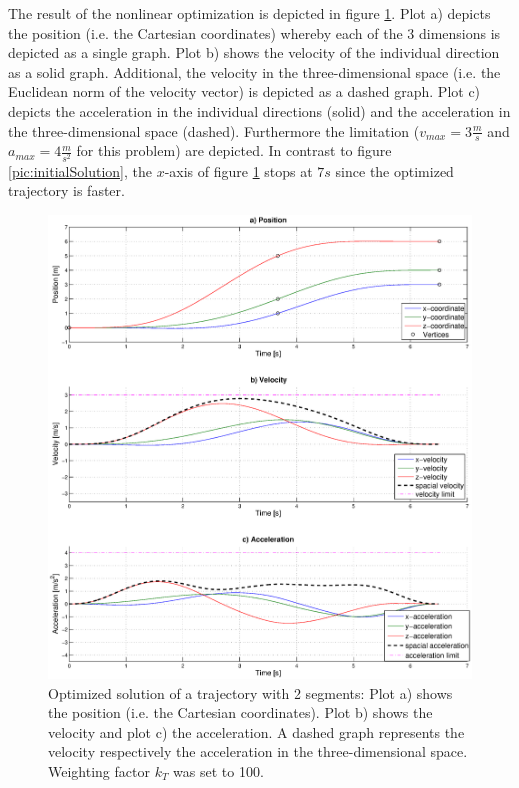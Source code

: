 The result of the nonlinear optimization is depicted in figure \ref{pic:optimizedSolution}. Plot a) depicts the position (i.e. the Cartesian coordinates) whereby each of the 3 dimensions is depicted as a single graph. Plot b) shows the velocity of the individual direction as a solid graph. Additional, the velocity in the three-dimensional space (i.e. the Euclidean norm of the velocity vector) is depicted as a dashed graph. Plot c) depicts the acceleration in the individual directions (solid) and the acceleration in the three-dimensional space (dashed). Furthermore the limitation ($v_{max} = 3 \frac{m}{s}$ and $a_{max} = 4 \frac{m}{s^2}$ for this problem) are depicted. In contrast to figure \ref{pic:initialSolution}, the $x$-axis of figure \ref{pic:optimizedSolution} stops at $7s$ since the optimized trajectory is faster.

\begin{figure}[h]
   \centering
   \includegraphics[trim = 33mm 20mm 30mm 8mm,clip,width=1\textwidth]{pics/2SegOpti6s52k100.eps}
   \caption{Optimized solution of a trajectory with 2 segments: Plot a) shows the position (i.e. the Cartesian coordinates). Plot b) shows the velocity and plot c) the acceleration. A dashed graph represents the velocity respectively the acceleration in the three-dimensional space. Weighting factor $k_T$ was set to 100.}
   \label{pic:optimizedSolution}
\end{figure}



